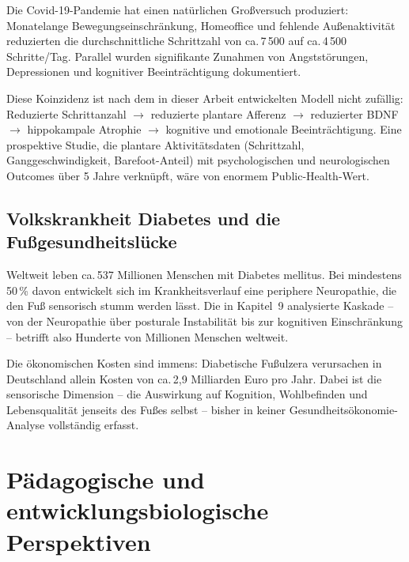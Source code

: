 ﻿\documentclass[12pt,a4paper]{report}
\theoremstyle{plain}
\theoremstyle{definition}
\theoremstyle{remark}
\begin{document}
Die Covid-19-Pandemie hat einen natürlichen Großversuch produziert:
Monatelange Bewegungseinschränkung, Homeoffice und fehlende
Außenaktivität reduzierten die durchschnittliche Schrittzahl von
ca.\,7\,500 auf ca.\,4\,500 Schritte/Tag. Parallel wurden
signifikante Zunahmen von Angststörungen, Depressionen und
kognitiver Beeinträchtigung dokumentiert.

Diese Koinzidenz ist nach dem in dieser Arbeit entwickelten Modell
nicht zufällig: Reduzierte Schrittanzahl $\to$ reduzierte plantare
Afferenz $\to$ reduzierter BDNF $\to$ hippokampale Atrophie $\to$
kognitive und emotionale Beeinträchtigung. Eine prospektive Studie,
die plantare Aktivitätsdaten (Schrittzahl, Ganggeschwindigkeit,
Barefoot-Anteil) mit psychologischen und neurologischen Outcomes
über 5 Jahre verknüpft, wäre von enormem Public-Health-Wert.

\subsection{Volkskrankheit Diabetes und die Fußgesundheitslücke}

Weltweit leben ca.\,537 Millionen Menschen mit Diabetes mellitus.
Bei mindestens 50\,\% davon entwickelt sich im Krankheitsverlauf
eine periphere Neuropathie, die den Fuß sensorisch stumm werden
lässt. Die in Kapitel~9 analysierte Kaskade -- von der Neuropathie
über posturale Instabilität bis zur kognitiven Einschränkung --
betrifft also Hunderte von Millionen Menschen weltweit.

Die ökonomischen Kosten sind immens: Diabetische Fußulzera
verursachen in Deutschland allein Kosten von ca.\,2,9 Milliarden
Euro pro Jahr. Dabei ist die sensorische Dimension -- die
Auswirkung auf Kognition, Wohlbefinden und Lebensqualität jenseits
des Fußes selbst -- bisher in keiner Gesundheitsökonomie-Analyse
vollständig erfasst.

\section{Pädagogische und entwicklungsbiologische Perspektiven}
\end{document}
